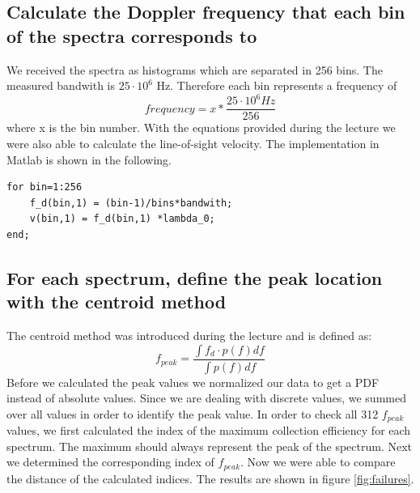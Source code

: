 \documentclass[10pt]{article}
\begin{document}
\subsection{Calculate the Doppler frequency that each bin of the spectra corresponds to}
We received the spectra as histograms which are separated in 256 bins. The measured bandwith is $25\cdot10^6 $ Hz. Therefore each bin represents a frequency of
\begin{equation*}
 frequency = x * \frac{25\cdot10^6 Hz}{256}
\end{equation*}
where x is the bin number.
With the equations provided during the lecture we were also able to calculate the line-of-sight velocity.
The implementation in Matlab is shown in the following.\\

\begin{lstlisting}
for bin=1:256
    f_d(bin,1) = (bin-1)/bins*bandwith;
    v(bin,1) = f_d(bin,1) *lambda_0;
end;
\end{lstlisting}

\subsection{For each spectrum, define the peak location with the centroid
method}
The centroid method was introduced during the lecture and is defined as:
\begin{equation*}
f_{peak} = \frac{\int f_d \cdot p(f) df}{\int p(f) df}
\end{equation*}
Before we calculated the peak values we normalized our data to get a PDF instead of absolute values.
Since we are dealing with discrete values, we summed over all values in order to identify the peak value. 
In order to check all 312 $f_{peak}$ values, we first calculated the index of the maximum collection efficiency for each spectrum. The maximum should always represent the peak of the spectrum.
Next we determined the corresponding index of $f_{peak}$. Now we were able to compare the distance of the calculated indices. The results are shown in figure \ref{fig:failures}.
\end{document}
